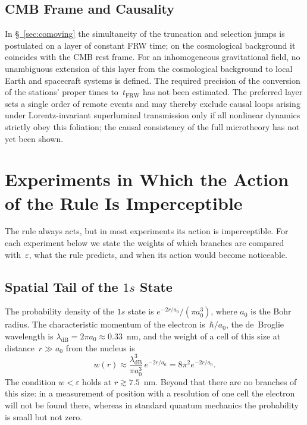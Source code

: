 \documentclass[11pt,a4paper]{article}
\begin{document}
\subsection{CMB Frame and Causality}
\label{sec:discussion-comoving}

In \hyperref[sec:comoving]{\S~\ref*{sec:comoving}} the simultaneity of the truncation and selection jumps is postulated on a layer of constant FRW time; on the cosmological background it coincides with the CMB rest frame. For an inhomogeneous gravitational field, no unambiguous extension of this layer from the cosmological background to local Earth and spacecraft systems is defined. The required precision of the conversion of the stations' proper times to~$t_{\mathrm{FRW}}$ has not been estimated. The preferred layer sets a single order of remote events and may thereby exclude causal loops arising under Lorentz-invariant superluminal transmission only if all nonlinear dynamics strictly obey this foliation; the causal consistency of the full microtheory has not yet been shown.

\appendix
\section{Experiments in Which the Action of the Rule Is Imperceptible}
\label{sec:scales}

The rule always acts, but in most experiments its action is imperceptible. For each experiment below we state the weights of which branches are compared with~$\varepsilon$, what the rule predicts, and when its action would become noticeable.

\subsection{Spatial Tail of the $1s$ State}
\label{sec:tail}

The probability density of the $1s$ state is $e^{-2r/a_0}/(\pi a_0^3)$, where $a_0$ is the Bohr radius. The characteristic momentum of the electron is~$\hbar/a_0$, the de~Broglie wavelength is $\lambda_{\mathrm{dB}}=2\pi a_0\approx0.33$~nm, and the weight of a cell of this size at distance~$r\gg a_0$ from the nucleus is
\begin{equation}
w(r)\approx\frac{\lambda_{\mathrm{dB}}^3}{\pi a_0^3}\,e^{-2r/a_0}=8\pi^2e^{-2r/a_0}.
\end{equation}
The condition $w<\varepsilon$ holds at $r\gtrsim7.5$~nm. Beyond that there are no branches of this size: in a measurement of position with a resolution of one cell the electron will not be found there, whereas in standard quantum mechanics the probability is small but not zero.
\end{document}
